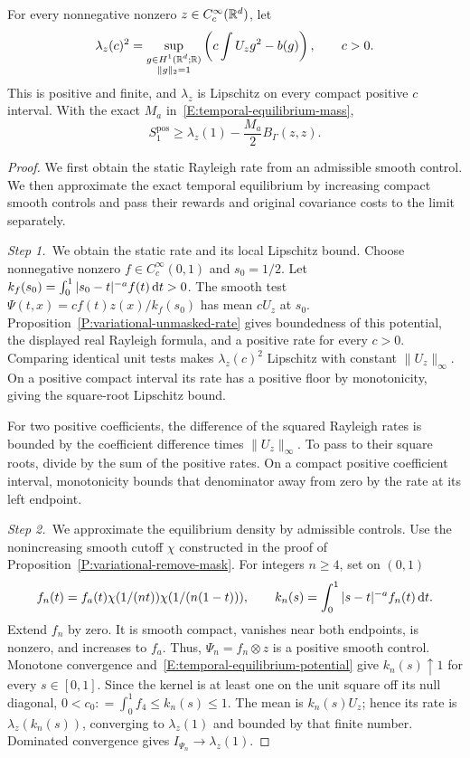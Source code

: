 \begin{lemma}\label{L:spatial-static-controls}
  For every nonnegative nonzero $z \in C_c^\infty(\mathbb{R}^d)$, let
  \[
    \lambda_z(c)^2=
    \sup_{\substack{g\in H^1(\mathbb{R}^d;\mathbb{R})\\\|g\|_2=1}}
    \left(c\int U_zg^2-b(g)\right),\qquad c>0.
  \]
  This is positive and finite, and $\lambda_z$ is Lipschitz on every compact
  positive $c$ interval. With the exact $M_a$
  in~\eqref{E:temporal-equilibrium-mass},
  \begin{equation}\label{E:spatial-static-score}
    S_1^{\mathrm{pos}}\ge
    \lambda_z(1)-\frac{M_a}{2}B_\Gamma(z,z).
  \end{equation}
\end{lemma}

\begin{proof}
  We first obtain the static Rayleigh rate from an admissible smooth control.
  We then approximate the exact temporal equilibrium by increasing compact
  smooth controls and pass their rewards and original covariance costs to the
  limit separately.


  \medskip
  \noindent\textit{Step 1.~}We obtain the static rate and its local Lipschitz
  bound.
  Choose nonnegative nonzero $f \in C_c^\infty(0,1)$ and $s_0 = 1/2$. Let
  $k_f(s_0) = \int_0^1|s_0-t|^{-a}f(t)\,\mathrm{d} t > 0$. The smooth test $\Psi(t,x) =
  cf(t)z(x)/k_f(s_0)$ has mean $cU_z$ at $s_0$.
  Proposition~\ref{P:variational-unmasked-rate} gives boundedness of this
  potential, the displayed real Rayleigh formula, and a positive rate for every
  $c > 0$. Comparing identical unit tests makes $\lambda_z(c)^2$ Lipschitz with
  constant $\|U_z\|_\infty$. On a positive compact interval its rate has a
  positive floor by monotonicity, giving the square-root Lipschitz bound.

  For two positive coefficients, the difference of the squared Rayleigh rates
  is bounded by the coefficient difference times $\|U_z\|_\infty$. To pass to
  their square roots, divide by the sum of the positive rates. On a compact
  positive coefficient interval, monotonicity bounds that denominator away
  from zero by the rate at its left endpoint.

  \medskip
  \noindent\textit{Step 2.~}We approximate the equilibrium density by
  admissible controls.
  Use the nonincreasing smooth cutoff $\chi$ constructed in the proof of
  Proposition~\ref{P:variational-remove-mask}. For integers $n \ge 4$, set on
  $(0,1)$
  \[
    f_n(t)=f_a(t)\chi(1/(nt))\chi(1/(n(1-t))),\qquad
    k_n(s)=\int_0^1|s-t|^{-a}f_n(t)\,\mathrm{d} t.
  \]
  Extend $f_n$ by zero. It is smooth compact, vanishes near both endpoints, is
  nonzero, and increases to $f_a$. Thus, $\Psi_n = f_n\otimes z$ is a positive
  smooth control. Monotone convergence
  and~\eqref{E:temporal-equilibrium-potential} give $k_n(s)\uparrow1$ for every
  $s \in [0,1]$. Since the kernel is at least one on the unit square off its
  null diagonal, $0 < c_0: = \int_0^1f_4 \le k_n(s) \le 1$. The mean is
  $k_n(s)U_z$; hence its rate is $\lambda_z(k_n(s))$, converging to
  $\lambda_z(1)$ and bounded by that finite number. Dominated convergence gives
  $I_{\Psi_n} \to \lambda_z(1)$.


\end{proof}
